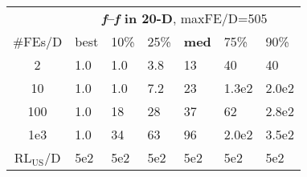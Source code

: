 \begin{tabular}{c|llllll}
 & \multicolumn{6}{|c}{\textbf{\textit{f}\raisebox{-0.35ex}{1}--\textit{f}\raisebox{-0.35ex}{24} in 20-D}, maxFE/D=505}\\
\#FEs/D & best & 10\% & 25\% & \textbf{med} & 75\% & 90\%\\
2 & \hspace*{1ex}1.0 & \hspace*{1ex}1.0 & \hspace*{1ex}3.8 & 13 & 40 & 40\\
10 & \hspace*{1ex}1.0 & \hspace*{1ex}1.0 & \hspace*{1ex}7.2 & 23 & 1.3e2 & 2.0e2\\
100 & \hspace*{1ex}1.0 & 18 & 28 & 37 & 62 & 2.8e2\\
1e3 & \hspace*{1ex}1.0 & 34 & 63 & 96 & 2.0e2 & 3.5e2\\
$\text{RL}_{\text{US}}$/D & 5e2 & 5e2 & 5e2 & 5e2 & 5e2 & 5e2
\end{tabular}
